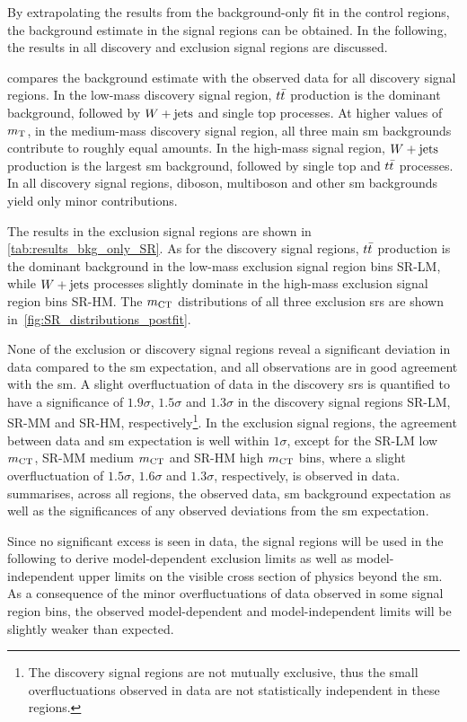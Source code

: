 By extrapolating the results from the background-only fit in the control regions, the background estimate in the signal regions can be obtained.
In the following, the results in all discovery and exclusion signal regions are discussed.

 compares the background estimate with the observed data for all discovery signal regions.
In the low-mass discovery signal region, $t\bar{t}$ production is the dominant background, followed by $W+\mathrm{jets}$ and single top processes. At higher values of $m_{\textrm{T}}$, \ie in the medium-mass discovery signal region, all three main \gls{sm} backgrounds contribute to roughly equal amounts.
In the high-mass signal region, $W+\mathrm{jets}$ production is the largest \gls{sm} background, followed by single top and $t\bar{t}$ processes.
In all discovery signal regions, diboson, multiboson and other \gls{sm} backgrounds yield only minor contributions. 

The results in the exclusion signal regions are shown in \cref{tab:results_bkg_only_SR}.
As for the discovery signal regions, $t\bar{t}$ production is the dominant background in the low-mass exclusion signal region bins SR-LM, while $W+\mathrm{jets}$ processes slightly dominate in the high-mass exclusion signal region bins SR-HM.
The $m_{\textrm{CT}}$ distributions of all three exclusion \glspl{sr} are shown in~\cref{fig:SR_distributions_postfit}.

None of the exclusion or discovery signal regions reveal a significant deviation in data compared to the \gls{sm} expectation, and all observations are in good agreement with the \gls{sm}.
A slight overfluctuation of data in the discovery \glspl{sr} is quantified to have a significance of $1.9\sigma$, $1.5\sigma$ and $1.3\sigma$ in the discovery signal regions SR-LM, SR-MM and SR-HM, respectively\footnote{The discovery signal regions are not mutually exclusive, thus the small overfluctuations observed in data are not statistically independent in these regions.}.
In the exclusion signal regions, the agreement between data and \gls{sm} expectation is well within $1\sigma$, except for the SR-LM low $m_{\textrm{CT}}$, SR-MM medium $m_{\textrm{CT}}$ and SR-HM high $m_{\textrm{CT}}$ bins, where a slight overfluctuation of $1.5\sigma$, $1.6\sigma$ and $1.3\sigma$, respectively, is observed in data.
 summarises, across all regions, the observed data, \gls{sm} background expectation as well as the significances of any observed deviations from the \gls{sm} expectation.

Since no significant excess is seen in data, the signal regions will be used in the following to derive model-dependent exclusion limits as well as model-independent upper limits on the visible cross section of physics beyond the \gls{sm}.
As a consequence of the minor overfluctuations of data observed in some signal region bins, the observed model-dependent and model-independent limits will be slightly weaker than expected. 

